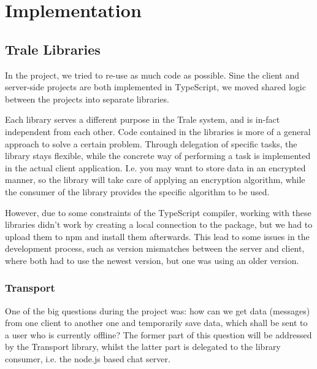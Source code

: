 \chapter{Implementation}\label{ch:implementation}

\lipsum[2-4]

\section{Trale Libraries}\label{sec:libraries}
In the project, we tried to re-use as much code as possible.
Sine the client and server-side projects are both implemented in TypeScript, we moved shared logic between the projects into separate libraries.

Each library serves a different purpose in the Trale system, and is in-fact independent from each other.
Code contained in the libraries is more of a general approach to solve a certain problem.
Through delegation of specific tasks, the library stays flexible, while the concrete way of performing a task is implemented in the actual client application.
I.e. you may want to store data in an encrypted manner, so the library will take care of applying an encryption algorithm, while the consumer of the library provides the specific algorithm to be used.

However, due to some constraints of the TypeScript compiler, working with these libraries didn't work by creating a local connection to the package, but we had to upload them to npm and install them afterwards.
This lead to some issues in the development process, such as version mismatches between the server and client, where both had to use the newest version, but one was using an older version.

\subsection{Transport}\label{subsec:transport}
One of the big questions during the project was: how can we get data (messages) from one client to another one and temporarily save data, which shall be sent to a user who is currently offline?
The former part of this question will be addressed by the Transport library, whilst the latter part is delegated to the library consumer, i.e. the node.js based chat server.

